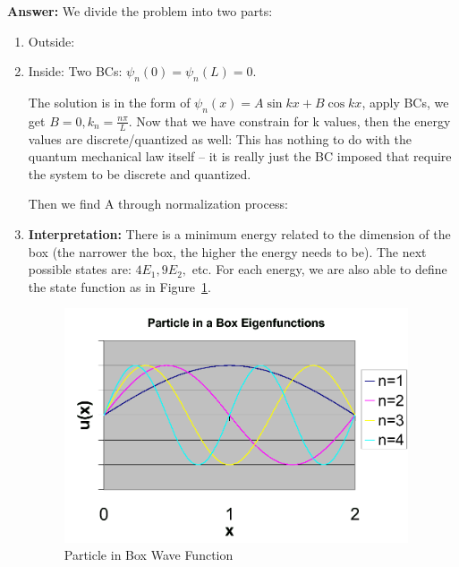\documentclass{school-22.101-notes}
\begin{document}
  \textbf{Answer:} We divide the problem into two parts:
  \begin{enumerate}
  \item Outside: 
  \item Inside: 
    Two BCs: $\psi_n (0) = \psi_n(L) =0$. 
    
    The solution is in the form of $\psi_n (x) = A \sin kx + B \cos kx$, apply BCs, we get $B=0, k_n = \frac{n \pi}{L} $. Now that we have constrain for k values, then the energy values are discrete/quantized as well: 
    This has nothing to do with the quantum mechanical law itself -- it is really just the BC imposed that require the system to be discrete and quantized. 
    
    Then we find A through normalization process:
    
  
\item \textbf{Interpretation:} There is a minimum energy related to the dimension of the box (the narrower the box, the higher the energy needs to be). The next possible states are: $4E_1, 9E_2,$ etc. For each energy, we are also able to define the state function as in Figure~\ref{particle-in-box}.
  \begin{figure}
    \centering
    \includegraphics[width=4in]{images/qm/1Dparticle-in-box.png}
    \caption{Particle in Box Wave Function\label{particle-in-box}}
  \end{figure}
\end{enumerate}
\end{document}
